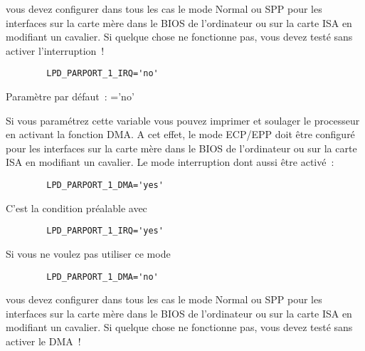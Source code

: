 \begin{description}
{        vous devez configurer dans tous les cas le mode Normal ou SPP pour les
        interfaces sur la carte mère dans le BIOS de l'ordinateur ou sur la carte
        ISA en modifiant un cavalier. Si quelque chose ne fonctionne pas, vous
        devez testé sans activer l'interruption~!

\begin{example}
\begin{verbatim}
        LPD_PARPORT_1_IRQ='no'
\end{verbatim}
\end{example}

        Paramètre par défaut~: ='no'}



        {Si vous paramétrez cette variable  vous
        pouvez imprimer et soulager le processeur en activant la fonction DMA.
        A cet effet, le mode ECP/EPP doit être configuré pour les interfaces sur
        la carte mère dans le BIOS de l'ordinateur ou sur la carte ISA en modifiant
        un cavalier. Le mode interruption dont aussi être activé~:

\begin{example}
\begin{verbatim}
        LPD_PARPORT_1_DMA='yes'
\end{verbatim}
\end{example}

        C'est la condition préalable avec

\begin{example}
\begin{verbatim}
        LPD_PARPORT_1_IRQ='yes'
\end{verbatim}
\end{example}

        Si vous ne voulez pas utiliser ce mode

\begin{example}
\begin{verbatim}
        LPD_PARPORT_1_DMA='no'
\end{verbatim}
\end{example}

        vous devez configurer dans tous les cas le mode Normal ou SPP pour les
        interfaces sur la carte mère dans le BIOS de l'ordinateur ou sur la carte
        ISA en modifiant un cavalier. Si quelque chose ne fonctionne pas, vous
        devez testé sans activer le DMA~!

}
\end{description}
